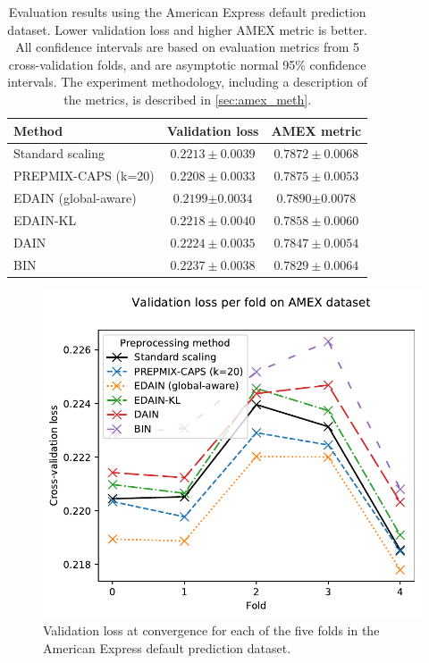 \documentclass{statsmsc}
\begin{document}
{%
\begin{table}[htp]
    \centering
    \begin{tabular}{lcc}
        \toprule
        Method & Validation loss & AMEX metric \\
        \midrule
        Standard scaling & $0.2213 \pm 0.0039$ & $0.7872 \pm 0.0068$ \\
        PREPMIX-CAPS (k=20) & $0.2208 \pm 0.0033$ & $0.7875 \pm 0.0053$ \\
        EDAIN (global-aware) & $\mathbf{0.2199} \bm\pm \mathbf{0.0034}$ & $\mathbf{0.7890} \bm\pm \mathbf{0.0078}$ \\
        EDAIN-KL & $0.2218 \pm 0.0040$ & $0.7858 \pm 0.0060$ \\
        DAIN & $0.2224 \pm 0.0035$ & $0.7847 \pm 0.0054$ \\
        BIN & $0.2237 \pm 0.0038$ & $0.7829 \pm 0.0064$ \\
        \bottomrule
    \end{tabular}%
    \caption{
        Evaluation results using the American Express default prediction dataset. Lower validation
        loss and higher AMEX metric is better.
        All confidence intervals are based on evaluation metrics from 5 cross-validation folds,
        and are asymptotic normal 95\% confidence intervals.
        The experiment methodology, including a description of the metrics,
        is described in  \cref{sec:amex_meth}.
    }%
    \label{tab:amex_performance}%
\end{table}

\begin{figure}[htp]
    \begin{center}
        \includegraphics[scale=1]{figures/amex_performance_convergence_per_fold}
    \end{center}
    \caption{Validation loss at convergence for each of the five folds in the American Express
    default prediction dataset.}
    \label{fig:amex_folds}
\end{figure}

}
\end{document}
